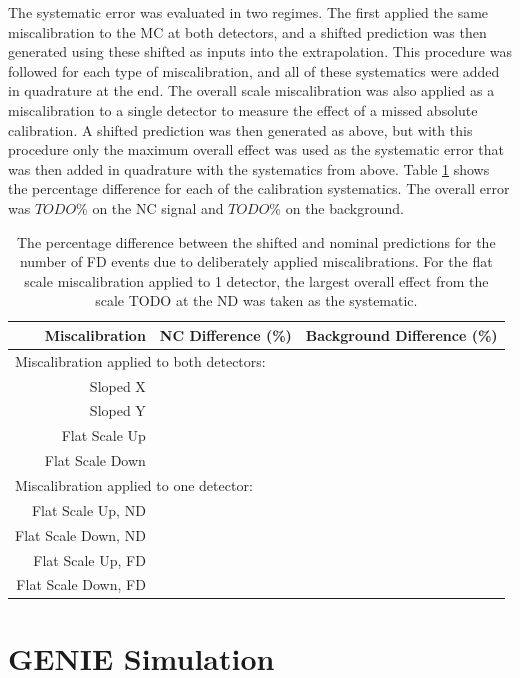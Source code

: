 The systematic error was evaluated in two regimes. The first applied the same miscalibration to the MC at both detectors, and a shifted prediction was then generated using these shifted as inputs into the extrapolation. This procedure was followed for each type of miscalibration, and all of these systematics were added in quadrature at the end. The overall scale miscalibration was also applied as a miscalibration to a single detector to measure the effect of a missed absolute calibration. A shifted prediction was then generated as above, but with this procedure only the maximum overall effect was used as the systematic error that was then added in quadrature with the systematics from above. Table \ref{tab:SystCalib} shows the percentage difference for each of the calibration systematics. The overall error was $TODO\%$ on the NC signal and $TODO\%$ on the background.
\begin{table}[h]
  \begin{center}
    \caption[Calibration Systematic Errors]{The percentage difference between the shifted and nominal predictions for the number of FD events due to deliberately applied miscalibrations. For the flat scale miscalibration applied to 1 detector, the largest overall effect from the scale TODO at the ND was taken as the systematic.}
    \label{tab:SystCalib}
    \begin{tabular}{r c c}
      \hline\hline
      Miscalibration & NC Difference (\%) & Background Difference (\%) \\
      \hline
      \multicolumn{3}{l}{Miscalibration applied to both detectors:} \\
      Sloped X & & \\
      Sloped Y & & \\
      Flat Scale Up & & \\
      Flat Scale Down & & \\
      \multicolumn{3}{l}{Miscalibration applied to one detector:} \\
      Flat Scale Up, ND & & \\
      Flat Scale Down, ND & & \\
      Flat Scale Up, FD & & \\
      Flat Scale Down, FD & & \\
      \hline
    \end{tabular}
  \end{center}
\end{table}

\section{GENIE Simulation}

